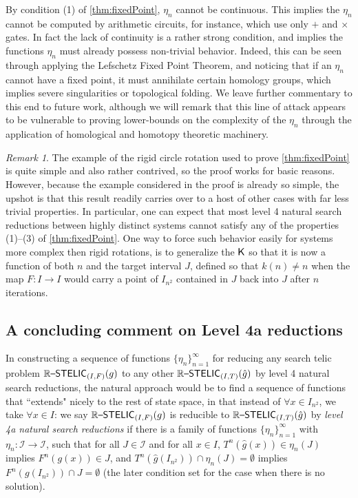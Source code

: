 \documentclass{amsart}
\theoremstyle{theorem}
\theoremstyle{remark}
\newtheorem{remark}[theorem]{Remark}
\newcommand{\ccK}{\textsf{\upshape K}}
\newcommand{\ccRSTELIC}{\mathbb{R}\textsf{\upshape --STELIC}}
\newcommand{\cI}{\mathcal{I}}
\begin{document}
By condition (1) of \cref{thm:fixedPoint}, $\eta_n$ cannot be continuous. This implies the $\eta_n$ cannot be computed by arithmetic circuits, for instance, which use only $+$ and $\times$ gates. In fact the lack of continuity is a rather strong condition, and implies the functions $\eta_n$ must already possess non-trivial behavior. Indeed, this can be seen through applying the Lefschetz Fixed Point Theorem, and noticing that if an $\eta_n$ cannot have a fixed point, it must annihilate certain homology groups, which implies severe singularities or topological folding. We leave further commentary to this end to future work, although we will remark that this line of attack appears to be vulnerable to proving lower-bounds on the complexity of the $\eta_n$ through the application of homological and homotopy theoretic machinery.

\begin{remark}
The example of the rigid circle rotation used to prove \cref{thm:fixedPoint} is quite simple and also rather contrived, so the proof works for basic reasons. However, because the example considered in the proof is already so simple, the upshot is that this result readily carries over to a host of other cases with far less trivial properties. In particular, one can expect that most level 4 natural search reductions between highly distinct systems cannot satisfy any of the properties (1)--(3) of \cref{thm:fixedPoint}. One way to force such behavior easily for systems more complex then rigid rotations, is to generalize the $\ccK$ so that it is now a function of both $n$ and the target interval $J$, defined so that $k(n)\neq n$ when the map $F:I\rightarrow I$ would carry a point of $I_{n^2}$ contained in $J$ back into $J$ after $n$ iterations.
\end{remark}


\subsection{A concluding comment on Level 4a reductions}

In constructing a sequence of functions $\{\eta_n\}_{n=1}^\infty$ for reducing any search telic problem $\ccRSTELIC_{(I, F)}(g)$ to any other $\ccRSTELIC_{(I, T)}(\hat{g})$ by level 4 natural search reductions, the natural approach would be to find a sequence of functions that ``extends" nicely to the rest of state space, in that instead of  $\forall x \in I_{n^2}$, we take $\forall x \in I$: we say $\ccRSTELIC_{(I, F)}(g)$ is reducible to $\ccRSTELIC_{(I, T)}(\hat{g})$ by \emph{level 4a natural search reductions} if there is a family of functions $\{\eta_n\}_{n=1}^\infty$ with $\eta_n:\cI\rightarrow \cI$, such that for all $J \in \cI$ and for all $x \in I$, $T^n(\hat{g}(x)) \in \eta_n(J)$ implies $F^n(g(x)) \in J$, and $T^n(\hat{g}(I_{n^2})) \cap \eta_n(J) = \emptyset$ implies $F^n(g(I_{n^2})) \cap J = \emptyset$ (the later condition set for the case when there is no solution).
\end{document}
